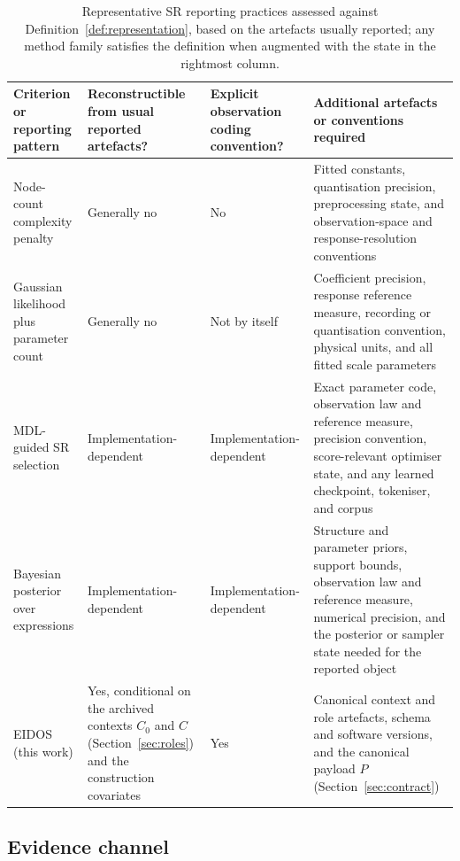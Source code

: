 \begin{table}[t]
\def\baselinestretch{1}\selectfont
\caption{Representative SR reporting practices assessed against Definition~\ref{def:representation}, based on the artefacts usually reported; any method family satisfies the definition when augmented with the state in the rightmost column.}\label{tab:reporting}
\centering
\scriptsize
\setlength{\tabcolsep}{3.0pt}
\renewcommand{\arraystretch}{1.16}
\begin{tabularx}{\textwidth}{@{}>{\raggedright\arraybackslash}p{}>{\raggedright\arraybackslash}p{}>{\raggedright\arraybackslash}p{}>{\raggedright\arraybackslash}X@{}}
\toprule
\textbf{Criterion or reporting pattern} & \textbf{Reconstructible from usual reported artefacts?} & \textbf{Explicit observation coding convention?} & \textbf{Additional artefacts or conventions required} \\
\midrule
Node-count complexity penalty & Generally no & No & Fitted constants, quantisation precision, preprocessing state, and observation-space and response-resolution conventions \\
Gaussian likelihood plus parameter count & Generally no & Not by itself & Coefficient precision, response reference measure, recording or quantisation convention, physical units, and all fitted scale parameters \\
MDL-guided SR selection \citep{bartlett2024exhaustive,yu2025mdlformer} & Implementation-dependent & Implementation-dependent & Exact parameter code, observation law and reference measure, precision convention, score-relevant optimiser state, and any learned checkpoint, tokeniser, and corpus \\
Bayesian posterior over expressions \citep{guimera2020bms} & Implementation-dependent & Implementation-dependent & Structure and parameter priors, support bounds, observation law and reference measure, numerical precision, and the posterior or sampler state needed for the reported object \\
EIDOS (this work) & Yes, conditional on the archived contexts \(C_0\) and \(C\) (Section~\ref{sec:roles}) and the construction covariates & Yes & Canonical context and role artefacts, schema and software versions, and the canonical payload \(P\) (Section~\ref{sec:contract}) \\
\bottomrule
\end{tabularx}
\end{table}

\subsection{Evidence channel}

